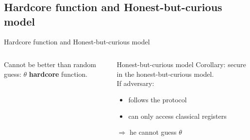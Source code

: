 \documentclass[]{beamer}
\begin{document}


\subsection{Hardcore function and Honest-but-curious model}
\begin{frame}[t]{Hardcore function and Honest-but-curious model}
  \begin{columns}
    \begin{column}{.5\textwidth}
    \begin{figure}[ht]
      \centering
    \end{figure}
    Cannot be better than random guess: $\theta$ \textbf{hardcore} function.
  \end{column}%
  \begin{column}{.5\textwidth}
    \begin{exampleblock}{Honest-but-curious model}
      Corollary: secure in the
      honest-but-curious model.\\
      If adversary:
      \begin{itemize}
      \item follows the protocol
      \item can only access classical registers
      \end{itemize}
      $\Rightarrow $ he cannot guess $\theta$
    \end{exampleblock}
  \end{column}
\end{columns}
\end{frame}
\end{document}

